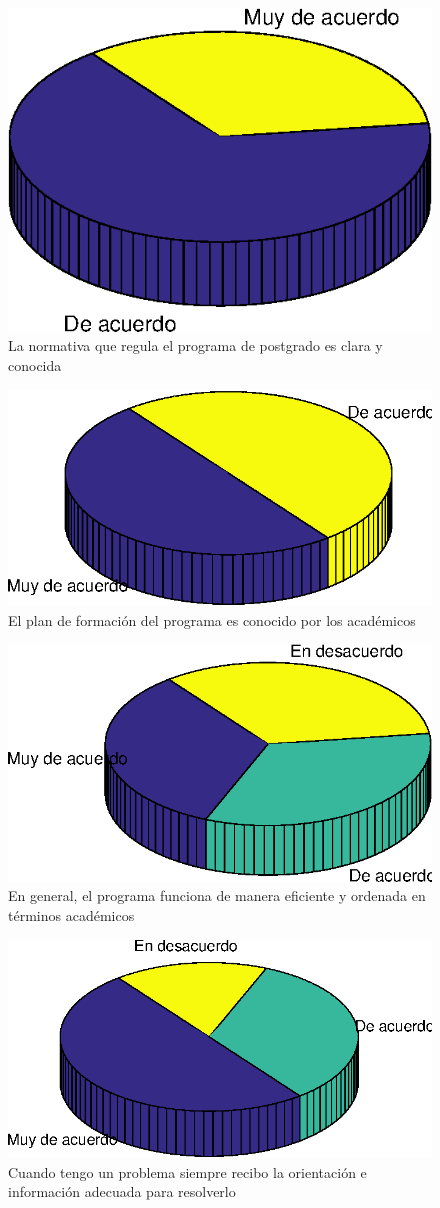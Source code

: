 \begin{figure}[ht]
\centering
\includegraphics[width=0.5\columnwidth]{./figure/graph1.eps}
\caption{La normativa que regula el programa de postgrado es clara y conocida}
\label{graph1}
\end{figure}

\begin{figure}[ht]
\centering
\includegraphics[width=0.5\columnwidth]{./figure/graph2.eps}
\caption{El plan de formación del programa es conocido por los académicos}
\label{graph2}
\end{figure}

\begin{figure}[ht]
\centering
\includegraphics[width=0.5\columnwidth]{./figure/graph3.eps}
\caption{En general, el programa funciona de manera eficiente y ordenada en términos académicos}
\label{graph3}
\end{figure}

\begin{figure}[ht]
\centering
\includegraphics[width=0.5\columnwidth]{./figure/graph4.eps}
\caption{Cuando tengo un problema siempre recibo la orientación e información adecuada para resolverlo}
\label{graph4}
\end{figure}

